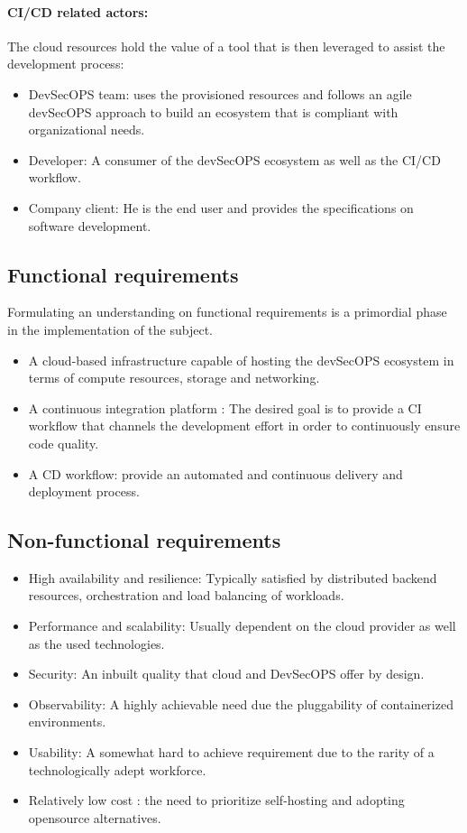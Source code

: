 \paragraph{CI/CD related actors:}
The cloud resources hold the value of a tool that is then leveraged to assist the development process:
\begin{itemize}[label={--}]
\item DevSecOPS team: uses the provisioned resources and follows an agile devSecOPS approach to build an ecosystem that is compliant with organizational needs.
\item Developer: A consumer of the devSecOPS ecosystem as well as the CI/CD workflow.
\item Company client: He is the end user and provides the specifications on software development.
\end{itemize}

\subsection{Functional requirements}

Formulating an understanding on functional requirements is a primordial phase in the implementation of the subject.

\begin{itemize}[label={--}]
\item A cloud-based infrastructure capable of hosting the devSecOPS ecosystem in terms of compute resources, storage and networking.
\item A continuous integration platform : The desired goal is to provide a CI workflow that channels the development effort in order to continuously ensure code quality.
\item A CD workflow: provide an automated and continuous delivery and deployment process.
\end{itemize}

\subsection{Non-functional requirements}

\begin{itemize}[label={--}]
\item High availability and resilience: Typically satisfied by distributed backend resources, orchestration and load balancing of workloads. 
\item Performance and scalability: Usually dependent on the cloud provider as well as the used technologies.
\item Security: An inbuilt quality that cloud and DevSecOPS offer by design.
\item Observability: A highly achievable need due the pluggability of containerized environments.
\item Usability: A somewhat hard to achieve requirement due to the rarity of a technologically adept workforce. 
\item Relatively low cost : the need to prioritize self-hosting and adopting opensource alternatives.
\end{itemize}

